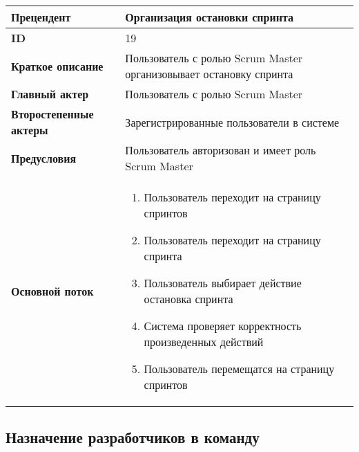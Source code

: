 \documentclass[14pt,a4paper]{extarticle}
\begin{document}
\begin{tabular}{|l|p{9cm}|}
	\hline
	\textbf{Прецендент}            & Организация остановки спринта                                      \\
	\hline
	\textbf{ID}                    & 19                                                                 \\
	\hline
	\textbf{Краткое описание}      & Пользователь с ролью Scrum Master организовывает остановку спринта \\
	\hline
	\textbf{Главный актер}         & Пользователь с ролью Scrum Master                                  \\
	\hline
	\textbf{Второстепенные актеры} & Зарегистрированные пользователи в системе                          \\
	\hline
	\textbf{Предусловия}           & Пользователь авторизован и имеет роль Scrum Master                 \\
	\hline
	\textbf{Основной поток}        & \begin{enumerate}
		                                 \item Пользователь переходит на страницу спринтов
		                                 \item Пользователь переходит на страницу спринта
		                                 \item Пользователь выбирает действие остановка спринта
		                                 \item Система проверяет корректность произведенных действий
		                                 \item Пользователь перемещатся на страницу спринтов
	                                 \end{enumerate}         \\
	\hline
\end{tabular}

\subsection{Назначение разработчиков в команду}
\end{document}
